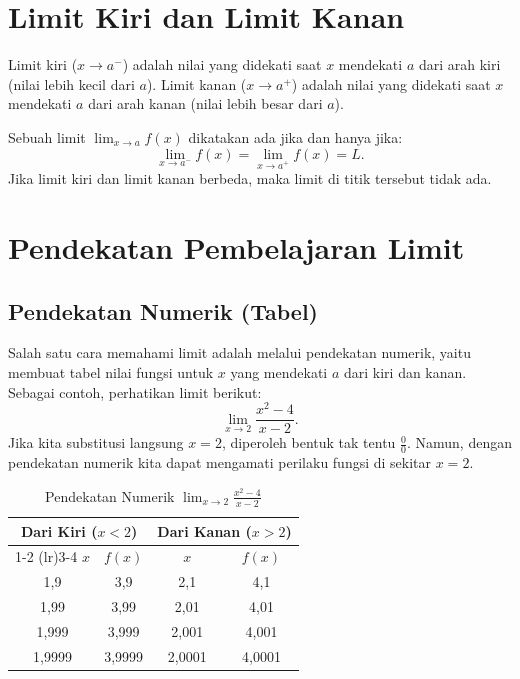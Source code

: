 \documentclass[12pt,a4paper,openany]{book}
\theoremstyle{definition}
\begin{document}
\section{Limit Kiri dan Limit Kanan}

Limit kiri ($x \to a^-$) adalah nilai yang didekati saat $x$ mendekati $a$ dari arah kiri (nilai lebih kecil dari $a$). Limit kanan ($x \to a^+$) adalah nilai yang didekati saat $x$ mendekati $a$ dari arah kanan (nilai lebih besar dari $a$).

Sebuah limit $\lim_{x \to a} f(x)$ dikatakan ada jika dan hanya jika:
\[
\lim_{x \to a^-} f(x) = \lim_{x \to a^+} f(x) = L.
\]
Jika limit kiri dan limit kanan berbeda, maka limit di titik tersebut tidak ada.

\section{Pendekatan Pembelajaran Limit}

\subsection{Pendekatan Numerik (Tabel)}

Salah satu cara memahami limit adalah melalui pendekatan numerik, yaitu membuat tabel nilai fungsi untuk $x$ yang mendekati $a$ dari kiri dan kanan. Sebagai contoh, perhatikan limit berikut:
\[
\lim_{x \to 2} \frac{x^2 - 4}{x - 2}.
\]
Jika kita substitusi langsung $x = 2$, diperoleh bentuk tak tentu $\frac{0}{0}$. Namun, dengan pendekatan numerik kita dapat mengamati perilaku fungsi di sekitar $x = 2$.

\begin{table}[h]
\centering
\caption{Pendekatan Numerik $\lim_{x \to 2} \frac{x^2-4}{x-2}$}
\label{tab:numerik}
\begin{tabular}{@{}cccc@{}}
\toprule
\multicolumn{2}{c}{\textbf{Dari Kiri ($x < 2$)}} & \multicolumn{2}{c}{\textbf{Dari Kanan ($x > 2$)}} \\
\cmidrule(lr){1-2} \cmidrule(lr){3-4}
$x$ & $f(x)$ & $x$ & $f(x)$ \\
\midrule
1,9 & 3,9 & 2,1 & 4,1 \\
1,99 & 3,99 & 2,01 & 4,01 \\
1,999 & 3,999 & 2,001 & 4,001 \\
1,9999 & 3,9999 & 2,0001 & 4,0001 \\
\bottomrule
\end{tabular}
\end{table}
\end{document}

